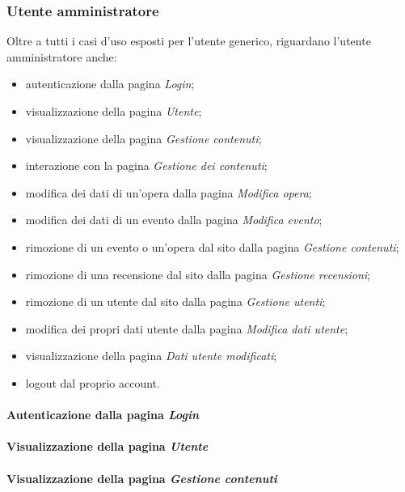 \subsubsection{Utente amministratore}
\label{analisi-casi-uso-attori-principali-utente-amministratore}
Oltre a tutti i casi d'uso esposti per l'utente generico, riguardano l'utente amministratore anche:
\begin{itemize}
	\item autenticazione dalla pagina \textit{Login};
	\item visualizzazione della pagina \textit{Utente};
	\item visualizzazione della pagina \textit{Gestione contenuti};
	\item interazione con la pagina \textit{Gestione dei contenuti};
	\item modifica dei dati di un'opera dalla pagina \textit{Modifica opera};
	\item modifica dei dati di un evento dalla pagina \textit{Modifica evento};
	\item rimozione di un evento o un'opera dal sito dalla pagina \textit{Gestione contenuti};
	\item rimozione di una recensione dal sito dalla pagina \textit{Gestione recensioni};
	\item rimozione di un utente dal sito dalla pagina \textit{Gestione utenti};
	\item modifica dei propri dati utente dalla pagina \textit{Modifica dati utente};
	\item visualizzazione della pagina \textit{Dati utente modificati};
	\item logout dal proprio account.
\end{itemize}

\paragraph{Autenticazione dalla pagina \textit{Login}}
\label{analisi-casi-uso-attori-principali-utente-amministratore-1}

\paragraph{Visualizzazione della pagina \textit{Utente}}
\label{analisi-casi-uso-attori-principali-utente-amministratore-2}

\paragraph{Visualizzazione della pagina \textit{Gestione contenuti}}
\label{analisi-casi-uso-attori-principali-utente-amministratore-3}

